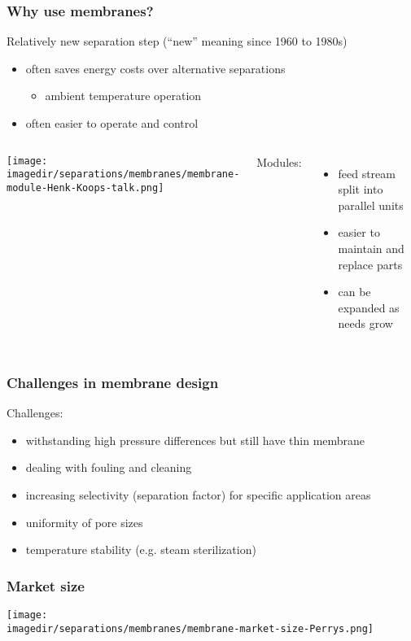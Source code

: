 \begin{frame}\frametitle{Why use membranes?}
	Relatively new separation step {\small (``new'' meaning since 1960 to 1980s)}
	\begin{itemize}
		\item	often saves energy costs over alternative separations
		\begin{itemize}
			\item	ambient temperature operation
		\end{itemize}
		\item	often easier to operate and control
	\end{itemize}
	
	
	\begin{columns}[c]
			\begin{center}
				\texttt{[image: \\imagedir/separations/membranes/membrane-module-Henk-Koops-talk.png]}
			\end{center}
			Modules:
			\begin{itemize}
				\item	feed stream split into parallel units
				\item	easier to maintain and replace parts
				\item	can be expanded as needs grow
			\end{itemize}			
	\end{columns}
\end{frame}

\begin{frame}\frametitle{Challenges in membrane design}
	Challenges:
	\begin{itemize}
		\item	withstanding high pressure differences but still have thin membrane
		\item	dealing with fouling and cleaning
		\item	increasing selectivity (separation factor) for specific application areas
		\item	uniformity of pore sizes
		\item	temperature stability (e.g. steam sterilization)
	\end{itemize}
\end{frame}

\begin{frame}\frametitle{Market size}
	\begin{center}
		\texttt{[image: \\imagedir/separations/membranes/membrane-market-size-Perrys.png]}
	\end{center}
\end{frame}

